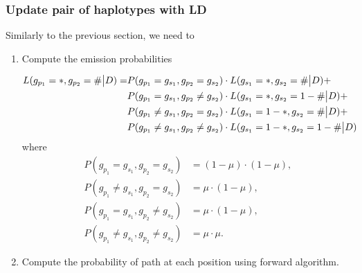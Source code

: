 \documentclass{bioinfo}
\begin{document}
\begin{methods}
\subsubsection{Update pair of haplotypes with LD}\label{sec:deconvolute}
Similarly to the previous section, we need to
\begin{enumerate}
\item Compute the emission probabilities

\begin{equation}
\begin{split}
L(g_{p_1} = *, g_{p_2} = \# \big{|} D) = & P(g_{p_1} = g_{s_1}, g_{p_2} = g_{s_2}) \cdot L(g_{s_1} = *, g_{s_2} = \# \big{|} D) + \\
                                         & P(g_{p_1} = g_{s_1}, g_{p_2} \neq g_{s_2}) \cdot L(g_{s_1} = *, g_{s_2} = 1-\# \big{|} D) + \\
                                         & P(g_{p_1} \neq g_{s_1}, g_{p_2} = g_{s_2}) \cdot L(g_{s_1} = 1-*, g_{s_2} = \# \big{|} D) + \\
                                         & P(g_{p_1} \neq g_{s_1}, g_{p_2} \neq g_{s_2}) \cdot L(g_{s_1} = 1-*, g_{s_2} = 1-\# \big{|} D)
\end{split}\label{eqn:gp_given_D:two}
\end{equation}
where
\begin{align*}
P(g_{p_1} = g_{s_1}, g_{p_2} = g_{s_2})       & = (1-\mu)\cdot(1-\mu) , \\
P(g_{p_1} \neq g_{s_1}, g_{p_2} = g_{s_2})    & = \mu\cdot(1-\mu),\\
P(g_{p_1} = g_{s_1}, g_{p_2} \neq g_{s_2})    & = \mu\cdot(1-\mu),\\
P(g_{p_1} \neq g_{s_1}, g_{p_2} \neq g_{s_2}) & = \mu \cdot \mu.
\end{align*}


\item
Compute the probability of path at each position using forward algorithm.


\end{enumerate}
\end{methods}
\end{document}
